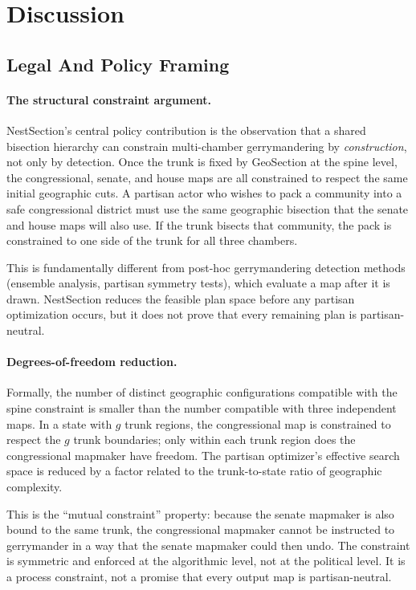 \section{Discussion}
\label{sec:discussion}

\subsection{Legal And Policy Framing}

\paragraph{The structural constraint argument.}
NestSection's central policy contribution is the observation that a shared
bisection hierarchy can constrain multi-chamber gerrymandering by
\emph{construction}, not only by detection.  Once the trunk is fixed by
GeoSection at the spine level,
the congressional, senate, and house maps are all constrained to respect the
same initial geographic cuts.  A partisan actor who wishes to pack a community
into a safe congressional district must use the same geographic bisection that
the senate and house maps will also use.  If the trunk bisects that community,
the pack is constrained to one side of the trunk for all three chambers.

This is fundamentally different from post-hoc gerrymandering detection methods
(ensemble analysis, partisan symmetry tests), which evaluate a map after it is
drawn.  NestSection reduces the feasible plan space before any partisan
optimization occurs, but it does not prove that every remaining plan is
partisan-neutral.

\paragraph{Degrees-of-freedom reduction.}
Formally, the number of distinct geographic configurations compatible with the
spine constraint is smaller than the number compatible with three independent
maps.  In a state with $g$ trunk regions, the congressional map is constrained
to respect the $g$ trunk boundaries; only within each trunk region does the
congressional mapmaker have freedom.  The partisan optimizer's effective search
space is reduced by a factor related to the trunk-to-state ratio of geographic
complexity.

This is the ``mutual constraint'' property: because the senate mapmaker is also
bound to the same trunk, the congressional mapmaker cannot be instructed to gerrymander in a way
that the senate mapmaker could then undo.  The constraint is symmetric and
enforced at the algorithmic level, not at the political level. It is a process
constraint, not a promise that every output map is partisan-neutral.

